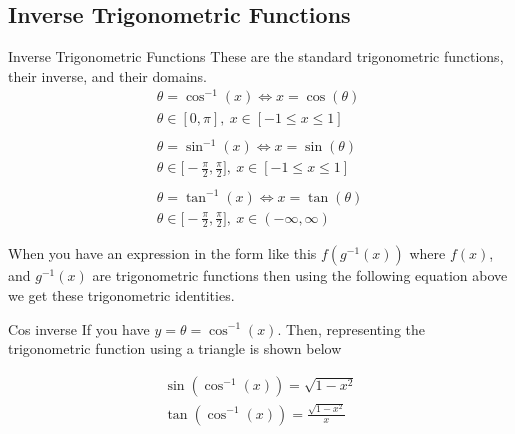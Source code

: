 \documentclass[letterpaper,10pt,twoside,twocolumn,openany]{book}
\begin{document}
\subsection{Inverse Trigonometric Functions}
\begin{DndSidebar}{Inverse Trigonometric Functions}
    These are the standard trigonometric functions, their inverse, and their domains.
    \begin{gather}
        \theta = \cos^{-1}(x) \Leftrightarrow x = \cos(\theta)\\ 
        \nonumber
        \theta\in [0,\pi],\ x\in[-1\leq x\leq 1]
        \nonumber\\
        \nonumber~\\  
        \theta = \sin^{-1}(x) \Leftrightarrow x = \sin(\theta)\\
        \nonumber
        \theta\in \biggl[-\frac{\pi}{2},\frac{\pi}{2}\biggl],\ x\in[-1\leq x\leq 1]
        \nonumber\\
        \nonumber~\\
        \theta = \tan^{-1}(x) \Leftrightarrow x = \tan(\theta)\\ 
        \nonumber
        \theta\in \biggl[-\frac{\pi}{2},\frac{\pi}{2}\biggl],\ x\in(-\infty, \infty)
    \end{gather}
\end{DndSidebar}
\newpage
When you have an expression in the form like this $f(g^{-1}(x))$ where $f(x)$, and $g^{-1}(x)$ are trigonometric functions then using the following equation above we get these trigonometric identities.

\begin{DndComment}{Cos inverse}
    If you have
    $
        y = \theta = \cos^{-1}(x)
    $.
    Then, representing the trigonometric function using a triangle is shown below\\
    \begin{gather}
        \sin(\cos^{-1}(x)) = \sqrt{1-x^2}\\
        \tan(\cos^{-1}(x)) = \frac{\sqrt{1-x^2}}{x}
    \end{gather}
\end{DndComment}
\end{document}
